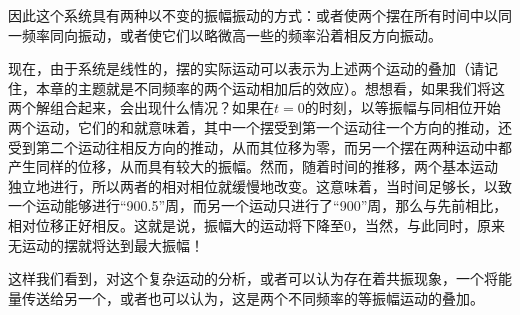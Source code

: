 因此这个系统具有两种以不变的振幅振动的方式：或者使两个摆在所有时间中以同一频率同向振动，或者使它们以略微高一些的频率沿着相反方向振动。

现在，由于系统是线性的，摆的实际运动可以表示为上述两个运动的叠加（请记住，本章的主题就是不同频率的两个运动相加后的效应）。想想看，如果我们将这两个解组合起来，会出现什么情况？如果在$t=0$的时刻，以等振幅与同相位开始两个运动，它们的和就意味着，其中一个摆受到第一个运动往一个方向的推动，还受到第二个运动往相反方向的推动，从而其位移为零，而另一个摆在两种运动中都产生同样的位移，从而具有较大的振幅。然而，随着时间的推移，两个基本运动 独立地进行，所以两者的相对相位就缓慢地改变。这意味着，当时间足够长，以致一个运动能够进行“900.5”周，而另一个运动只进行了“900”周，那么与先前相比，相对位移正好相反。这就是说，振幅大的运动将下降至0，当然，与此同时，原来无运动的摆就将达到最大振幅！

这样我们看到，对这个复杂运动的分析，或者可以认为存在着共振现象，一个将能量传送给另一个，或者也可以认为，这是两个不同频率的等振幅运动的叠加。